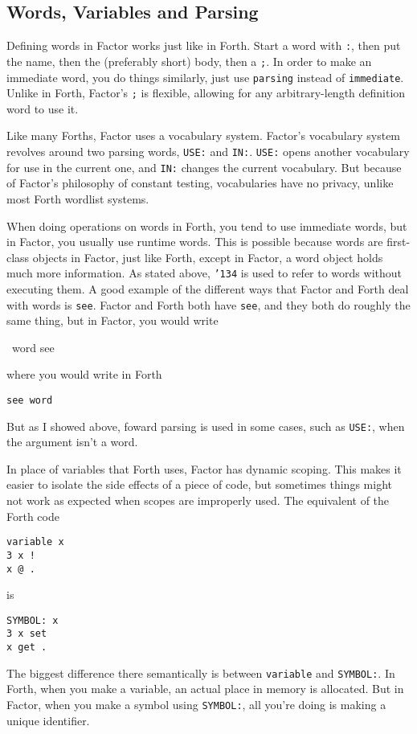 \documentclass{article}
\begin{document}
\subsection{Words, Variables and Parsing}

Defining words in Factor works just like in Forth. Start a word with \texttt{:}, then put the name, then the (preferably short) body, then a \texttt{;}. In order to make an immediate word, you do things similarly, just use \texttt{parsing} instead of \texttt{immediate}. Unlike in Forth, Factor's \texttt{;} is flexible, allowing for any arbitrary-length definition word to use it.

Like many Forths, Factor uses a vocabulary system. Factor's vocabulary system revolves around two parsing words, \texttt{USE:} and \texttt{IN:}. \texttt{USE:} opens another vocabulary for use in the current one, and \texttt{IN:} changes the current vocabulary. But because of Factor's philosophy of constant testing, vocabularies have no privacy, unlike most Forth wordlist systems. 

When doing operations on words in Forth, you tend to use immediate words, but in Factor, you usually use runtime words. This is possible because words are first-class objects in Factor, just like Forth, except in Factor, a word object holds much more information. As stated above, \texttt{\char'134} is used to refer to words without executing them. A good example of the different ways that Factor and Forth deal with words is \texttt{see}. Factor and Forth both have \texttt{see}, and they both do roughly the same thing, but in Factor, you would write
\begin{verb}
\ word see
\end{verb}
where you would write in Forth
\begin{verbatim}
see word
\end{verbatim}
But as I showed above, foward parsing is used in some cases, such as \texttt{USE:}, when the argument isn't a word.

In place of variables that Forth uses, Factor has dynamic scoping. This makes it easier to isolate the side effects of a piece of code, but sometimes things might not work as expected when scopes are improperly used. The equivalent of the Forth code
\begin{verbatim}
variable x
3 x !
x @ .
\end{verbatim}
is
\begin{verbatim}
SYMBOL: x
3 x set
x get .
\end{verbatim}
The biggest difference there semantically is between \texttt{variable} and \texttt{SYMBOL:}. In Forth, when you make a variable, an actual place in memory is allocated. But in Factor, when you make a symbol using \texttt{SYMBOL:}, all you're doing is making a unique identifier.
\end{document}
